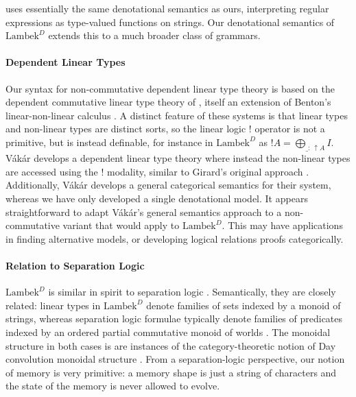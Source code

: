 \documentclass[acmsmall,nonacm]{acmart}
\newcommand{\theoryabbv}{$\textrm{Lambek}^D$\xspace}
\newcommand{\ltonl}[1]{~\uparrow #1}
\newcommand{\LinSigTy}[3]{\textstyle\bigoplus_{#1 : #2} #3}
\begin{document}
\citet{elliottSymbolicAutomaticDifferentiation2021} uses essentially the same denotational semantics as ours, interpreting regular expressions as type-valued functions on strings. Our denotational semantics of \theoryabbv extends this to a much broader class of grammars.

\paragraph{Dependent Linear Types}
Our syntax for non-commutative dependent linear type theory is based on the
dependent commutative linear type theory of
\citet{krishnaswami_integrating_2015}, itself an extension of Benton's
linear-non-linear calculus \cite{benton1994}. A distinct feature of these
systems is that linear types and non-linear types are distinct sorts, so the
linear logic $!$ operator is not a primitive, but is instead definable, for
instance in \theoryabbv as $!A = \LinSigTy{\_}{\ltonl A}{I}$.  V\'ak\'ar
develops a dependent linear type theory where instead the non-linear types are
accessed using the $!$ modality, similar to Girard's original approach
\cite{vakar2015,girard_linear_1987}. Additionally, V\'ak\'ar develops a general
categorical semantics for their system, whereas we have only developed a single
denotational model. It appears straightforward to adapt V\'ak\'ar's general
semantics approach to a non-commutative variant that would apply to
\theoryabbv. This may have applications in finding alternative models, or
developing logical relations proofs categorically.

\paragraph{Relation to Separation Logic}

\theoryabbv is similar in spirit to separation logic
\cite{reynolds_separation_2002}. Semantically, they are closely
related: linear types in \theoryabbv denote families of sets indexed
by a monoid of strings, whereas separation logic formulae typically
denote families of predicates indexed by an ordered partial
commutative monoid of worlds \cite{jung_higher-order_2016}. The
monoidal structure in both cases is are instances of the
category-theoretic notion of Day convolution monoidal structure
\cite{day1970construction}. From a separation-logic perspective, our
notion of memory is very primitive: a memory shape is just a string of
characters and the state of the memory is never allowed to evolve.
\end{document}
